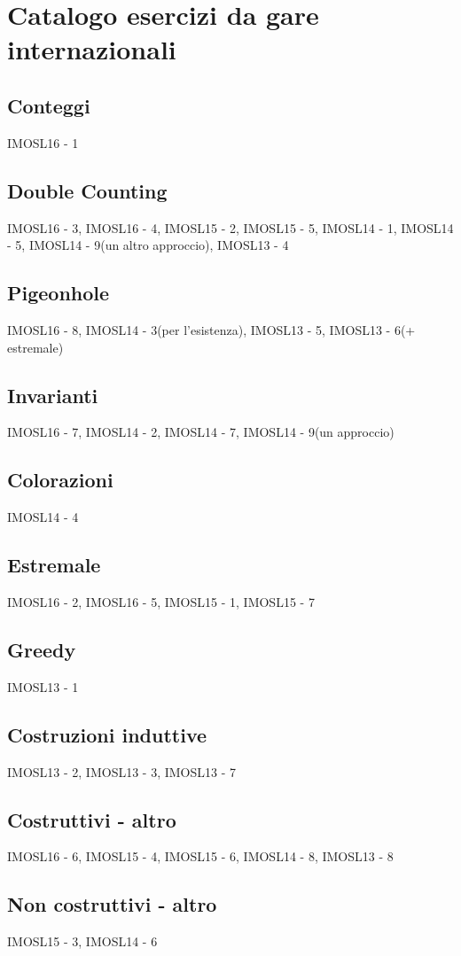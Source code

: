 \documentclass[a4paper,10pt]{article}
\newcommand{\Pro}[3]{#1#2 - #3}
\begin{document}
\section{Catalogo esercizi da gare internazionali}

\subsection{Conteggi}
\Pro{IMOSL}{16}{1}

\subsection{Double Counting}
\Pro{IMOSL}{16}{3}, \Pro{IMOSL}{16}{4}, \Pro{IMOSL}{15}{2}, \Pro{IMOSL}{15}{5}, \Pro{IMOSL}{14}{1}, \Pro{IMOSL}{14}{5}, \Pro{IMOSL}{14}{9}(un altro approccio), \Pro{IMOSL}{13}{4}

\subsection{Pigeonhole}
\Pro{IMOSL}{16}{8}, \Pro{IMOSL}{14}{3}(per l'esistenza), \Pro{IMOSL}{13}{5}, \Pro{IMOSL}{13}{6}(+ estremale)

\subsection{Invarianti}
\Pro{IMOSL}{16}{7}, \Pro{IMOSL}{14}{2}, \Pro{IMOSL}{14}{7}, \Pro{IMOSL}{14}{9}(un approccio)

\subsection{Colorazioni}
\Pro{IMOSL}{14}{4}

\subsection{Estremale}
\Pro{IMOSL}{16}{2}, \Pro{IMOSL}{16}{5}, \Pro{IMOSL}{15}{1}, \Pro{IMOSL}{15}{7}

\subsection{Greedy}
\Pro{IMOSL}{13}{1}

\subsection{Costruzioni induttive}
\Pro{IMOSL}{13}{2}, \Pro{IMOSL}{13}{3}, \Pro{IMOSL}{13}{7}

\subsection{Costruttivi - altro}
\Pro{IMOSL}{16}{6}, \Pro{IMOSL}{15}{4}, \Pro{IMOSL}{15}{6}, \Pro{IMOSL}{14}{8}, \Pro{IMOSL}{13}{8}

\subsection{Non costruttivi - altro}
\Pro{IMOSL}{15}{3}, \Pro{IMOSL}{14}{6}
\end{document}
